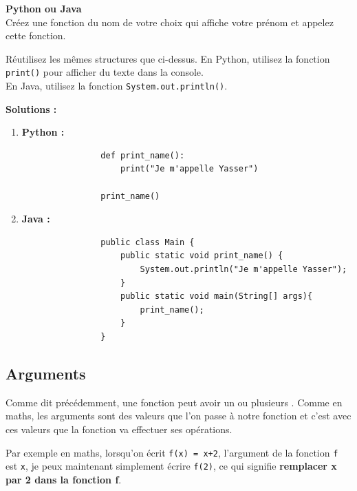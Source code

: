 \begin{Exercice}[5 minutes] \textbf{Python ou Java} \\
    Créez une fonction du nom de votre choix qui affiche votre prénom et appelez cette fonction.
    \\
    
    \begin{conseil}
    Réutilisez les mêmes structures que ci-dessus.
    En Python, utilisez la fonction \lstinline{print()} pour afficher du texte dans la console. \\
    En Java, utilisez la fonction \lstinline{System.out.println()}.
    \end{conseil}
    
    \textbf{Solutions :}
    \begin{enumerate}
        \item \textbf{Python :}
            \begin{verbatim}
                def print_name():
                    print("Je m'appelle Yasser")
                    
                print_name()
            \end{verbatim}
        \item \textbf{Java :}
            \begin{verbatim}
                public class Main {
                    public static void print_name() {
                        System.out.println("Je m'appelle Yasser"); 
                    }
                    public static void main(String[] args){
                        print_name();
                    }
                }
            \end{verbatim}
    \end{enumerate}
        
\end{Exercice}

\subsection{Arguments}

Comme dit précédemment, une fonction peut avoir un ou plusieurs . Comme en maths, les arguments sont des valeurs que l'on passe à notre fonction et c'est avec ces valeurs que la fonction va effectuer ses opérations.

Par exemple en maths, lorsqu'on écrit \lstinline{f(x) = x+2}, l'argument de la fonction \lstinline{f} est \lstinline{x}, je peux maintenant simplement écrire \lstinline{f(2)}, ce qui signifie \textbf{remplacer x par 2 dans la fonction f}.

